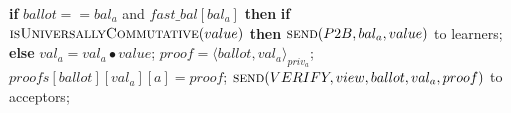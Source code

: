 \begin{algorithm}
\begin{algorithmic}[1]
		\State
		\State \textbf{if} $ballot == bal_a$ and $fast\_bal[bal_a]$ \textbf{then}
		\State \hspace{\algorithmicindent} \textbf{if} $\Call{isUniversallyCommutative}{value}$ \textbf{then}
		\State \hspace{\algorithmicindent}\hspace{\algorithmicindent} $\Call{send}{P2B,bal_a, value}$ to learners;
		\State \hspace{\algorithmicindent} \textbf{else}
		\State \hspace{\algorithmicindent}\hspace{\algorithmicindent} $val_a = val_a \bullet value$;
		\State \hspace{\algorithmicindent}\hspace{\algorithmicindent} $proof = \langle ballot, val_a \rangle_{priv_a}$;
		\State \hspace{\algorithmicindent}\hspace{\algorithmicindent} $proofs[ballot][val_a][a] = proof$;
		\State \hspace{\algorithmicindent}\hspace{\algorithmicindent} $\Call{send}{VERIFY, view, ballot, val_a, proof}$ to acceptors;
		\EndFunction
	\end{algorithmic}
\end{algorithm}

